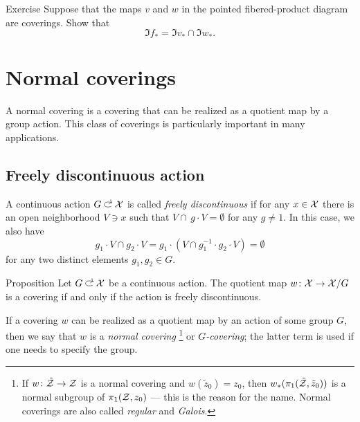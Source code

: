 {

\begin{figure}
\vskip-4mm
\centering
{}
\end{figure}

\begin{thm}{Exercise}\label{ex:fibered-product-pi1}
Suppose that the maps $v$ and $w$ in the pointed fibered-product diagram are coverings.
Show that
\[\Im f_*=\Im v_*\cap \Im w_*.\]
\end{thm}


\chapter{Normal coverings}\label{chap:Normal coverings}

A normal covering is a covering that can be realized as a quotient map by a group action.
This class of coverings is particularly important in many applications.

\section{Freely discontinuous action}

A continuous action $G\acts \c{X}$ is called \emph{freely discontinuous} if for any $x\in\mathcal{X}$ there is an open neighborhood $V \ni x$ such that
$V\cap\, g\cdot V=\emptyset$ for any $g\ne 1$.
In this case, we also have
\[
g_1\cdot V\cap g_2\cdot V=g_1\cdot (V\cap g_1^{-1}\cdot g_2\cdot V)=\emptyset
\]
for any two distinct elements $g_1,g_2\in G$.

\begin{thm}{Proposition}\label{prop:freely-discontinuous}
Let $G\acts \c{X}$ be a continuous action.
The quotient map $w\colon\mathcal{X}\to \mathcal{X}/G$ is a covering if and only if the action is freely discontinuous.
\end{thm}

If a covering $w$ can be realized as a quotient map by an action of some group $G$, then we say that $w$ is a \emph{normal covering}%
\footnote{If $w\colon\tilde{\mathcal{Z}}\to \mathcal{Z}$ is a normal covering and $w(\tilde z_0)=z_0$, then $w_*(\pi_1(\tilde{\mathcal{Z}},\tilde z_0))$ is a normal subgroup of $\pi_1(\mathcal{Z}, z_0)$ --- this is the reason for the name.
Normal coverings are also called \emph{regular} and \emph{Galois}.} or \emph{$G$-covering};
the latter term is used if one needs to specify the group.

}
